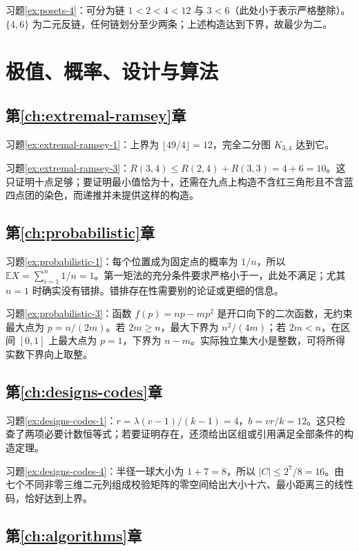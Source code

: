 \documentclass[UTF8,12pt,a4paper,fontset=fandol]{ctexbook}
\begin{document}
习题\ref{ex:posets-4}：可分为链 $1<2<4<12$ 与 $3<6$（此处小于表示严格整除）。$\{4,6\}$ 为二元反链，任何链划分至少两条；上述构造达到下界，故最少为二。

\section{极值、概率、设计与算法}

\subsection{第\ref{ch:extremal-ramsey}章}

习题\ref{ex:extremal-ramsey-1}：上界为 $\lfloor49/4\rfloor=12$，完全二分图 $K_{3,4}$ 达到它。

习题\ref{ex:extremal-ramsey-3}：$R(3,4)\le R(2,4)+R(3,3)=4+6=10$。这只证明十点足够；要证明最小值恰为十，还需在九点上构造不含红三角形且不含蓝四点团的染色，而递推并未提供这样的构造。

\subsection{第\ref{ch:probabilistic}章}

习题\ref{ex:probabilistic-1}：每个位置成为固定点的概率为 $1/n$，所以 $\mathbb E X=\sum_{i=1}^n1/n=1$。第一矩法的充分条件要求严格小于一，此处不满足；尤其 $n=1$ 时确实没有错排。错排存在性需要别的论证或更细的信息。

习题\ref{ex:probabilistic-3}：函数 $f(p)=np-mp^2$ 是开口向下的二次函数，无约束最大点为 $p=n/(2m)$。若 $2m\ge n$，最大下界为 $n^2/(4m)$；若 $2m<n$，在区间 $[0,1]$ 上最大点为 $p=1$，下界为 $n-m$。实际独立集大小是整数，可将所得实数下界向上取整。

\subsection{第\ref{ch:designs-codes}章}

习题\ref{ex:designs-codes-1}：$r=\lambda(v-1)/(k-1)=4$，$b=vr/k=12$。这只检查了两项必要计数恒等式；若要证明存在，还须给出区组或引用满足全部条件的构造定理。

习题\ref{ex:designs-codes-4}：半径一球大小为 $1+7=8$，所以 $|C|\le2^7/8=16$。由七个不同非零三维二元列组成校验矩阵的零空间给出大小十六、最小距离三的线性码，恰好达到上界。

\subsection{第\ref{ch:algorithms}章}
\end{document}
